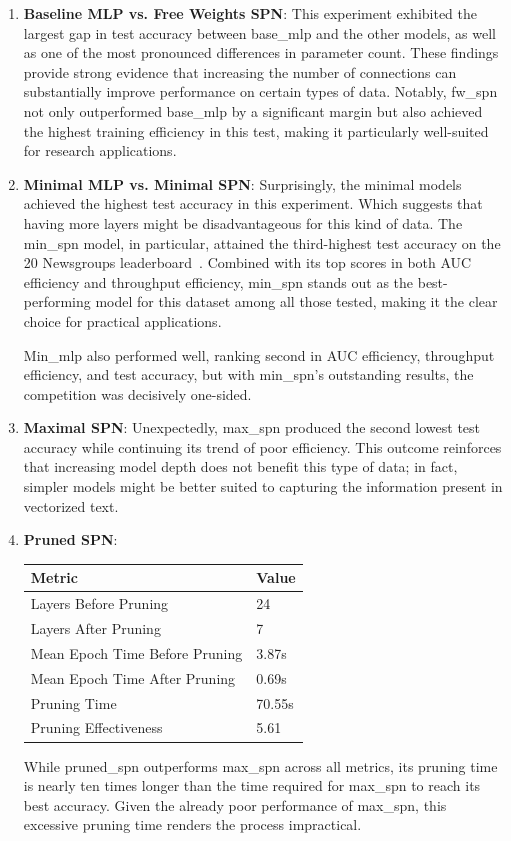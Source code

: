 \begin{enumerate}
\item \textbf{Baseline MLP vs. Free Weights SPN}: This experiment exhibited the largest gap in test accuracy between base\_mlp and the other models, as well as one of the most pronounced differences in parameter count. These findings provide strong evidence that increasing the number of connections can substantially improve performance on certain types of data. Notably, fw\_spn not only outperformed base\_mlp by a significant margin but also achieved the highest training efficiency in this test, making it particularly well-suited for research applications.
\item \textbf{Minimal MLP vs. Minimal SPN}: Surprisingly, the minimal models achieved the highest test accuracy in this experiment. Which suggests that having more layers might be disadvantageous for this kind of data. The min\_spn model, in particular, attained the third-highest test accuracy on the 20 Newsgroups leaderboard~\cite{pwc_20newsgroups_leaderboard}. Combined with its top scores in both AUC efficiency and throughput efficiency, min\_spn stands out as the best-performing model for this dataset among all those tested, making it the clear choice for practical applications.

Min\_mlp also performed well, ranking second in AUC efficiency, throughput efficiency, and test accuracy, but with min\_spn’s outstanding results, the competition was decisively one-sided.
\item \textbf{Maximal SPN}: Unexpectedly, max\_spn produced the second lowest test accuracy while continuing its trend of poor efficiency. This outcome reinforces that increasing model depth does not benefit this type of data; in fact, simpler models might be better suited to capturing the information present in vectorized text.
\item \textbf{Pruned SPN}:
\begin{center}  %
\begin{tabular}{|l|l|}
\hline
\textbf{Metric} & \textbf{Value} \\
\hline
Layers Before Pruning & 24 \\
Layers After Pruning & 7 \\
Mean Epoch Time Before Pruning & 3.87s \\
Mean Epoch Time After Pruning & 0.69s \\
Pruning Time & 70.55s \\
Pruning Effectiveness & 5.61 \\
\hline
\end{tabular}
\end{center}

While pruned\_spn outperforms max\_spn across all metrics, its pruning time is nearly ten times longer than the time required for max\_spn to reach its best accuracy. Given the already poor performance of max\_spn, this excessive pruning time renders the process impractical.

\end{enumerate}

